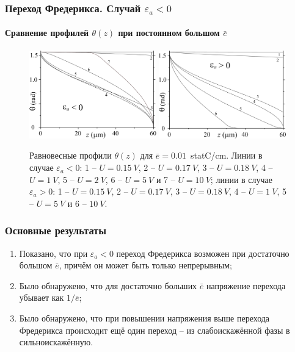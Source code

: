 \documentclass[utf8,secheader]{beamer}
\begin{document}
\begin{frame}
\frametitle{Переход Фредерикса. Случай $\varepsilon_a < 0$}
\framesubtitle{Сравнение профилей $\theta(z)$ при постоянном большом $\bar{e}$}
\begin{figure}[h]
\includegraphics[width=0.49\textwidth]{Profiles_at_fixed_e_0_01_change_U.eps}%
\includegraphics[width=0.49\textwidth]{Profiles_POSITIVE_EA_at_fixed_e_0_01_change_U.eps}
\caption{Равновесные профили $\theta(z)$ для $\bar{e}=0.01$~statC/cm. Линии в случае $\varepsilon_a<0$: 1 -- $U=0.15 ~V$, 2 -- $U = 0.17 ~V$, 3 -- $U = 0.18 ~V$, 4 -- $U = 1 ~V$, 5 -- $U = 2 ~V$, 6 -- $U = 5 ~V$ и 7 -- $U = 10 ~V$; линии в случае  $\varepsilon_a > 0$: 1 -- $U = 0.15 ~V$, 2 -- $U = 0.17 ~V$, 3 -- $U = 0.18 ~V$, 4 -- $U = 1 ~V$, 5 -- $U = 5 ~V$ и 6 -- $10 ~V$.}
\end{figure}
\end{frame}

\begin{frame}
\frametitle{Основные результаты}
\begin{enumerate}
\item Показано, что при $\varepsilon_a < 0$ переход Фредерикса возможен при достаточно большом $\bar{e}$, причём он может быть только непрерывным;
\item Было обнаружено, что для достаточно больших $\bar{e}$ напряжение перехода убывает как $1/\bar{e}$;
\item Было обнаружено, что при повышении напряжения выше перехода Фредерикса происходит ещё один переход -- из слабоискажённой фазы в сильноискажённую.
\end{enumerate}
\end{frame}
\end{document}
